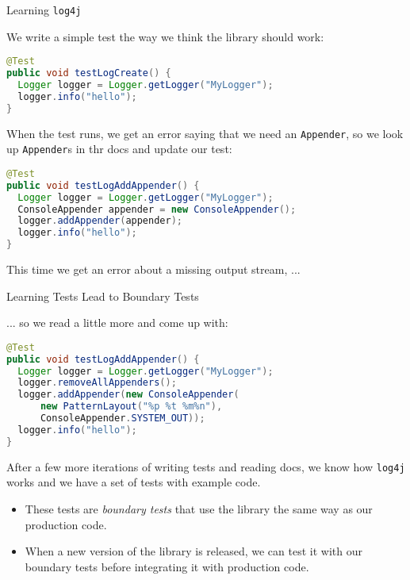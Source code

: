 \documentclass{beamer}
\begin{document}
\begin{frame}[fragile]{Learning {\tt log4j}}


We write a simple test the way we think the library should work:
\begin{lstlisting}[language=Java]
@Test
public void testLogCreate() {
  Logger logger = Logger.getLogger("MyLogger");
  logger.info("hello");
}
\end{lstlisting}

When the test runs, we get an error saying that we need an {\tt Appender}, so we look up {\tt Appender}s in thr docs and update our test:
\begin{lstlisting}[language=Java]
@Test
public void testLogAddAppender() {
  Logger logger = Logger.getLogger("MyLogger");
  ConsoleAppender appender = new ConsoleAppender();
  logger.addAppender(appender);
  logger.info("hello");
}
\end{lstlisting}

This time we get an error about a missing output stream, ...


\end{frame}

\begin{frame}[fragile]{Learning Tests Lead to Boundary Tests}

... so we read a little more and come up with:
\begin{lstlisting}[language=Java]
@Test
public void testLogAddAppender() {
  Logger logger = Logger.getLogger("MyLogger");
  logger.removeAllAppenders();
  logger.addAppender(new ConsoleAppender(
      new PatternLayout("%p %t %m%n"),
      ConsoleAppender.SYSTEM_OUT));
  logger.info("hello");
}
\end{lstlisting}

After a few more iterations of writing tests and reading docs, we know how {\tt log4j} works and we have a set of tests with example code.
\begin{itemize}
\item These tests are {\it boundary tests} that use the library the same way as our production code.
\item When a new version of the library is released, we can test it with our boundary tests before integrating it with production code.
\end{itemize}


\end{frame}
\end{document}
